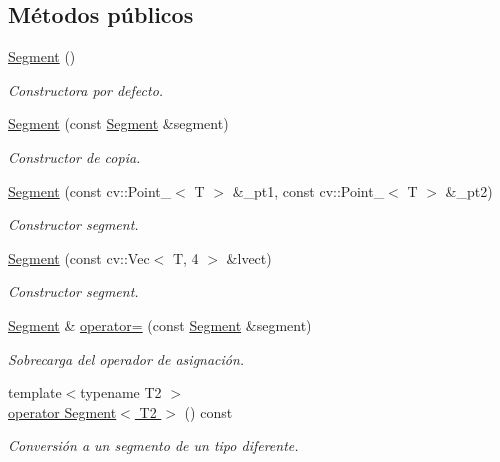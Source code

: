 \subsection*{Métodos públicos}
\begin{DoxyCompactItemize}
\item 
\hyperlink{group___geometric_entities_gac1c7a78862638e88bd9d9f512d6acc49}{Segment} ()
\begin{DoxyCompactList}\small\item\em Constructora por defecto. \end{DoxyCompactList}\item 
\hyperlink{group___geometric_entities_ga39a1c7ab363a4531d780dd35b6fc79f6}{Segment} (const \hyperlink{class_i3_d_1_1_segment}{Segment} \&segment)
\begin{DoxyCompactList}\small\item\em Constructor de copia. \end{DoxyCompactList}\item 
\hyperlink{group___geometric_entities_ga76e944eff092cf055965199957820f5b}{Segment} (const cv\+::\+Point\+\_\+$<$ T $>$ \&\+\_\+pt1, const cv\+::\+Point\+\_\+$<$ T $>$ \&\+\_\+pt2)
\begin{DoxyCompactList}\small\item\em Constructor segment. \end{DoxyCompactList}\item 
\hyperlink{group___geometric_entities_ga01623dcfd1be4e9472390b59e0ca3a58}{Segment} (const cv\+::\+Vec$<$ T, 4 $>$ \&lvect)
\begin{DoxyCompactList}\small\item\em Constructor segment. \end{DoxyCompactList}\item 
\hyperlink{class_i3_d_1_1_segment}{Segment} \& \hyperlink{group___geometric_entities_gad1b2c0a4c4e1ea3c43ee24630eb26f1b}{operator=} (const \hyperlink{class_i3_d_1_1_segment}{Segment} \&segment)
\begin{DoxyCompactList}\small\item\em Sobrecarga del operador de asignación. \end{DoxyCompactList}\item 
{\footnotesize template$<$typename T2 $>$ }\\\hyperlink{group___geometric_entities_ga363ef30b40d13ee361b9f0e32f135655}{operator Segment$<$ T2 $>$} () const 
\begin{DoxyCompactList}\small\item\em Conversión a un segmento de un tipo diferente. \end{DoxyCompactList}\item 

\end{DoxyCompactItemize}

